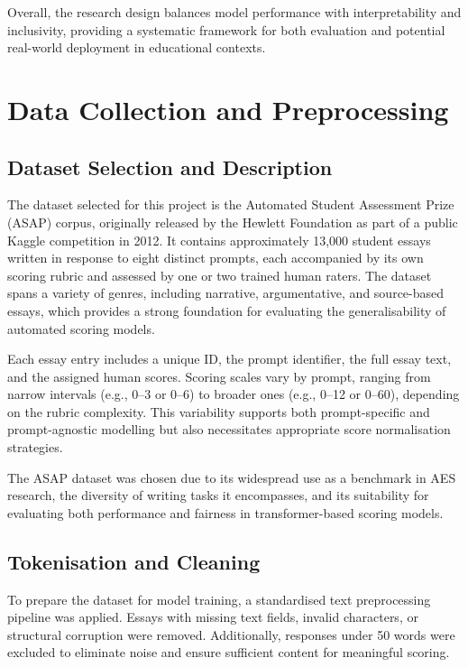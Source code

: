 \documentclass[10pt]{report}
\begin{document}
Overall, the research design balances model performance with interpretability and inclusivity, providing a systematic framework for both evaluation and potential real-world deployment in educational contexts.

\section{Data Collection and Preprocessing}

\subsection{Dataset Selection and Description}
The dataset selected for this project is the Automated Student Assessment Prize (ASAP) corpus, originally released by the Hewlett Foundation as part of a public Kaggle competition in 2012. It contains approximately 13,000 student essays written in response to eight distinct prompts, each accompanied by its own scoring rubric and assessed by one or two trained human raters. The dataset spans a variety of genres, including narrative, argumentative, and source-based essays, which provides a strong foundation for evaluating the generalisability of automated scoring models.

Each essay entry includes a unique ID, the prompt identifier, the full essay text, and the assigned human scores. Scoring scales vary by prompt, ranging from narrow intervals (e.g., 0–3 or 0–6) to broader ones (e.g., 0–12 or 0–60), depending on the rubric complexity. This variability supports both prompt-specific and prompt-agnostic modelling but also necessitates appropriate score normalisation strategies.

The ASAP dataset was chosen due to its widespread use as a benchmark in AES research, the diversity of writing tasks it encompasses, and its suitability for evaluating both performance and fairness in transformer-based scoring models.

\subsection{Tokenisation and Cleaning}
To prepare the dataset for model training, a standardised text preprocessing pipeline was applied. Essays with missing text fields, invalid characters, or structural corruption were removed. Additionally, responses under 50 words were excluded to eliminate noise and ensure sufficient content for meaningful scoring.
\end{document}

